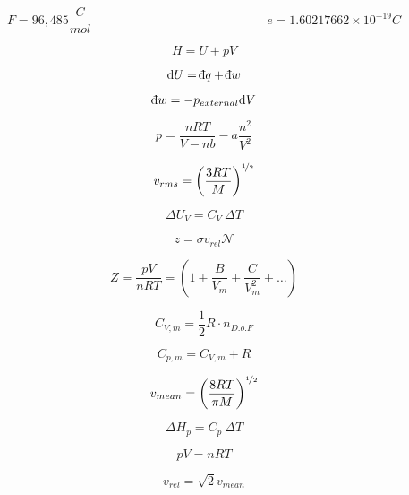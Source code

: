 \documentclass[12pt, letterpaper]{memoir}
\begin{document}
\begin{equation*}
	F=96,485\frac{C}{mol} \hspace{14em} e=1.60217662\times10^{-19} C
\end{equation*}


\noindent
\begin{minipage}{0.5\linewidth}
	\begin{equation*}
		H = U + pV
	\end{equation*}

	\begin{equation*}
		\mathrm{d} U = \dbar q + \dbar w
	\end{equation*}

	\begin{equation*}
		\dbar w = -p_{external} \mathrm{d}V
	\end{equation*}

	\begin{equation*}
		p = \frac{nRT}{V-nb} - a\frac{n^2}{V^2}
	\end{equation*}

	\begin{equation*}
		v_{rms} = \left(\frac{3RT}{M}\right)^{\nicefrac{1}{2}}
	\end{equation*}

	\begin{equation*}
		\Delta U_V = C_V~\Delta T
	\end{equation*}

	\begin{equation*}
		z = \sigma v_{rel}\mathcal{N}
	\end{equation*}



\end{minipage}
\begin{minipage}{0.5\linewidth}
	\begin{equation*}
		Z=\dfrac{pV}{nRT}=\left(1+\dfrac{B}{V_m} + \dfrac{C}{V_m^2}+\ldots\right)
	\end{equation*}

	\begin{equation*}
		C_{V,m} = \dfrac{1}{2}R\cdot n_{D.o.F}
	\end{equation*}

	\begin{equation*}
		C_{p,m} = C_{V,m}+R
	\end{equation*}

	\begin{equation*}
		v_{mean} = \left(\frac{8RT}{\pi M}\right)^{\nicefrac{1}{2}}
	\end{equation*}

	\begin{equation*}
		\Delta H_p= C_p~\Delta T
	\end{equation*}

	\begin{equation*}
		pV=nRT
	\end{equation*}

	\begin{equation*}
		v_{rel} = \sqrt{2}v_{mean}
	\end{equation*}




\end{minipage}
\end{document}
